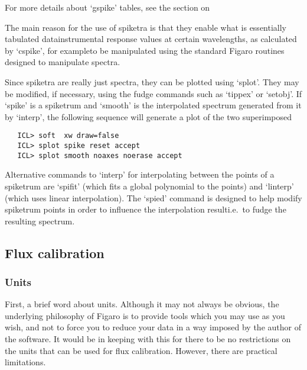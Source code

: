    For more details about `gspike' tables, see
   {the section on }

   The main reason for the use of spiketra is that they enable what is
   essentially tabulated data\latorhtm{---}{-}instrumental response values at
   certain wavelengths, as calculated by `cspike', for
   example\latorhtm{---}{-}to be
   manipulated using the standard Figaro routines designed to manipulate
   spectra.

   Since spiketra are really just spectra, they can be plotted using
   `splot'.  They may be modified, if necessary, using the fudge
   commands such as `tippex' or `setobj'.  If `spike' is a spiketrum and
   `smooth' is the interpolated spectrum generated from it by `interp',
   the following sequence will generate a plot of the two
   superimposed\latorhtm{---}{-}

\begin{verbatim}
   ICL> soft  xw draw=false
   ICL> splot spike reset accept
   ICL> splot smooth noaxes noerase accept
\end{verbatim}

   Alternative commands to `interp' for interpolating between the points
   of a spiketrum are `spifit' (which fits a global polynomial to the
   points) and `linterp' (which uses linear interpolation).  The `spied'
   command is designed to help modify spiketrum points in order to
   influence the interpolation result\latorhtm{---}{-}i.e.\ to fudge the
   resulting spectrum.


\subsection{\label{techno5}Flux calibration}


\subsubsection{\label{techno5units}Units}

   First, a brief word about units.  Although it may not always be
   obvious, the underlying philosophy of Figaro is to provide tools
   which  you may use as you wish, and not to force you to reduce your
   data in a way imposed by the author of the software.  It would be in
   keeping with this for there to be no restrictions on the units that
   can be used for flux calibration.  However, there are practical
   limitations.

